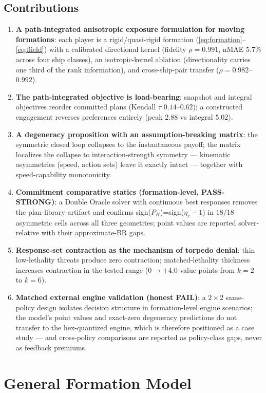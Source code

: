 \documentclass[12pt,a4paper]{article}
\newcommand{\etar}{\eta_r}
\begin{document}
\subsection{Contributions}
\begin{enumerate}
\item \textbf{A path-integrated anisotropic exposure formulation for moving
formations}: each player is a rigid/quasi-rigid formation
(\eqref{eq:formation}--\eqref{eq:ffield}) with a calibrated directional
kernel (fidelity $\rho=0.991$, nMAE $5.7\%$ across four ship classes), an
isotropic-kernel ablation (directionality carries one third of the rank
information), and cross-ship-pair transfer ($\rho=0.982$--$0.992$).
\item \textbf{The path-integrated objective is load-bearing}: snapshot and
integral objectives reorder committed plans (Kendall $\tau$ $0.14$--$0.62$);
a constructed engagement reverses preferences entirely (peak $2.88$ vs
integral $5.02$).
\item \textbf{A degeneracy proposition with an assumption-breaking matrix}:
the symmetric closed loop collapses to the instantaneous payoff; the matrix
localizes the collapse to interaction-strength symmetry --- kinematic
asymmetries (speed, action sets) leave it exactly intact --- together with
speed-capability monotonicity.
\item \textbf{Commitment comparative statics (formation-level,
PASS-STRONG)}: a Double Oracle solver with continuous best responses
removes the plan-library artifact and confirms sign($P_H$)=sign($\etar-1$)
in $18/18$ asymmetric cells across all three geometries; point values are
reported solver-relative with their approximate-BR gaps.
\item \textbf{Response-set contraction as the mechanism of torpedo denial}:
thin low-lethality threats produce zero contraction; matched-lethality
thickness increases contraction in the tested range ($0\to+4.0$ value points from
$k{=}2$ to $k{=}6$).
\item \textbf{Matched external engine validation (honest FAIL)}: a
$2\times2$ same-policy design isolates decision structure in formation-level
engine scenarios; the model's point values and exact-zero degeneracy
predictions do not transfer to the hex-quantized engine, which is
therefore positioned as a case study --- and cross-policy comparisons are
reported as policy-class gaps, never as feedback premiums.
\end{enumerate}

\section{General Formation Model}\label{sec:model}
\end{document}
